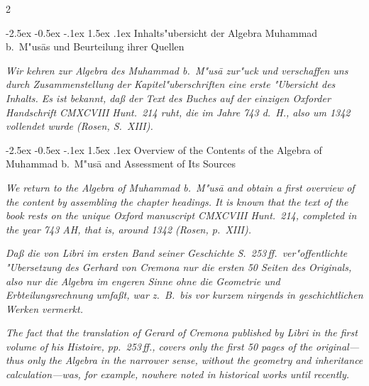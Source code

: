 \documentclass[10pt,a4paper]{article}
\makeatletter
\renewcommand{\section}{\@startsection{section}{1}{\z@}%
  {-2.5ex \@plus -0.5ex \@minus -.1ex}%
  {1.5ex \@plus .1ex}%
  {\normalfont\large\bfseries\color{sectioncolor}}}
\makeatother
\begin{document}
\clearpage


\begin{paracol}{2}

\section{Inhalts"ubersicht der Algebra Muhammad b.\ M"us\=as und Beurteilung ihrer Quellen}

\textit{Wir kehren zur Algebra des Muhammad b.\ M"us\=a zur"uck und verschaffen uns durch Zusammenstellung der Kapitel"uberschriften eine erste "Ubersicht des Inhalts. Es ist bekannt, da\ss{} der Text des Buches auf der einzigen Oxforder Handschrift CMXCVIII Hunt.\ 214 ruht, die im Jahre 743 d.\ H., also um 1342 vollendet wurde (Rosen, S.\ XIII).}

\switchcolumn

\section{Overview of the Contents of the Algebra of Muhammad b.\ M"us\=a and Assessment of Its Sources}

\textit{We return to the Algebra of Muhammad b.\ M"us\=a and obtain a first overview of the content by assembling the chapter headings. It is known that the text of the book rests on the unique Oxford manuscript CMXCVIII Hunt.\ 214, completed in the year 743 AH, that is, around 1342 (Rosen, p.\ XIII).}

\switchcolumn*

\textit{Da\ss{} die von Libri im ersten Band seiner \textit{Geschichte} S.\ 253\,ff.\ ver"offentlichte "Ubersetzung des Gerhard von Cremona nur die ersten 50 Seiten des Originals, also nur die Algebra im engeren Sinne ohne die Geometrie und Erbteilungsrechnung umfa\ss{}t, war z.\ B.\ bis vor kurzem nirgends in geschichtlichen Werken vermerkt.}

\switchcolumn

\textit{The fact that the translation of Gerard of Cremona published by Libri in the first volume of his \textit{Histoire}, pp.\ 253\,ff., covers only the first 50 pages of the original---thus only the Algebra in the narrower sense, without the geometry and inheritance calculation---was, for example, nowhere noted in historical works until recently.}

\switchcolumn*


\end{paracol}
\end{document}
